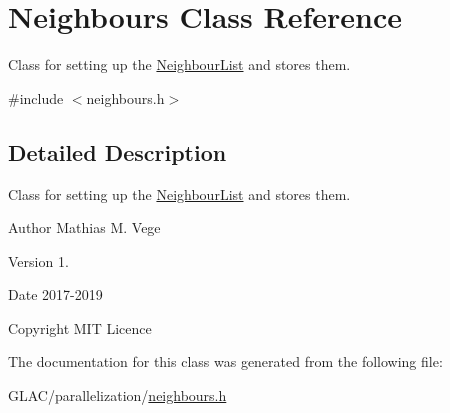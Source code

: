 \hypertarget{class_neighbours}{}\section{Neighbours Class Reference}
\label{class_neighbours}


Class for setting up the \mbox{\hyperlink{struct_neighbour_list}{Neighbour\+List}} and stores them.  




{\ttfamily \#include $<$neighbours.\+h$>$}



\subsection{Detailed Description}
Class for setting up the \mbox{\hyperlink{struct_neighbour_list}{Neighbour\+List}} and stores them. 

\begin{DoxyAuthor}{Author}
Mathias M. Vege 
\end{DoxyAuthor}
\begin{DoxyVersion}{Version}
1. 
\end{DoxyVersion}
\begin{DoxyDate}{Date}
2017-\/2019 
\end{DoxyDate}
\begin{DoxyCopyright}{Copyright}
M\+IT Licence 
\end{DoxyCopyright}


The documentation for this class was generated from the following file\+:\begin{DoxyCompactItemize}
\item 
G\+L\+A\+C/parallelization/\mbox{\hyperlink{neighbours_8h}{neighbours.\+h}}\end{DoxyCompactItemize}
